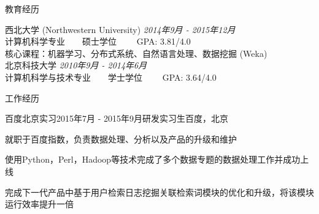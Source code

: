 \documentclass{resume} %
\begin{document}

\begin{rSection}{教育经历}

{\large 西北大学 (Northwestern University)} \hfill {\em 2014年9月 - 2015年12月} \\
计算机科学专业~~~~硕士学位~~~~
GPA: 3.81/4.0\\
核心课程：机器学习、分布式系统、自然语言处理、数据挖掘 (Weka)\\[0.3em]
{\large 北京科技大学} \hfill {\em 2010年9月 - 2014年6月} \\
计算机科学与技术专业~~~~学士学位~~~~
GPA: 3.64/4.0
\end{rSection}

\begin{rSection}{工作经历}
\begin{rSubsection}{百度北京实习}{2015年7月 - 2015年9月}{研发实习生}{百度，北京}
\item 就职于百度指数，负责数据处理、分析以及产品的升级和维护
\item 使用Python，Perl，Hadoop等技术完成了多个数据专题的数据处理工作并成功上线
\item 完成下一代产品中基于用户检索日志挖掘关联检索词模块的优化和升级，将该模块运行效率提升一倍
\end{rSubsection}
\end{rSection}
\end{document}
